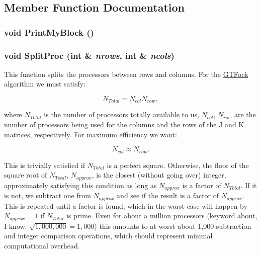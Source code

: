 \subsection{Member Function Documentation}
\hypertarget{classJKBuilder_1_1DistributedMatrix_a83da6054896e4107ab7e0c71fe0067ff}{
\subsubsection[{PrintMyBlock}]{\setlength{\rightskip}{0pt plus 5cm}void PrintMyBlock ()}}
\label{classJKBuilder_1_1DistributedMatrix_a83da6054896e4107ab7e0c71fe0067ff}
\hypertarget{classJKBuilder_1_1DistributedMatrix_a97f9cb6c12da83dc8006d442247a769a}{
\subsubsection[{SplitProc}]{\setlength{\rightskip}{0pt plus 5cm}void SplitProc (int \& {\em nrows}, \/  int \& {\em ncols})}}
\label{classJKBuilder_1_1DistributedMatrix_a97f9cb6c12da83dc8006d442247a769a}


This function splits the processors between rows and columns. For the \hyperlink{namespaceGTFock}{GTFock} algorithm we must satisfy:

\[ N_{Total}=N_{col}N_{row},\]

where $N_{Total}$ is the number of processors totally available to us, $N_{col}$, $N_{row}$ are the number of processors being used for the columns and the rows of the J and K matrices, respectively. For maximum efficiency we want:

\[N_{col}\approx N_{row}.\]

This is trivially satisfied if $N_{Total}$ is a perfect square. Otherwise, the floor of the square root of $N_{Total}$, $N_{approx}$, is the closest (without going over) integer, approximately satisfying this condition as long as $N_{approx}$ is a factor of $N_{Total}$. If it is not, we subtract one from $N_{approx}$ and see if the result is a factor of $N_{approx}$. This is repeated until a factor is found, which in the worst case will happen by $N_{approx}=1$ if $N_{Total}$ is prime. Even for about a million processors (keyword about, I know: $\sqrt{1,000,000}=1,000$) this amounts to at worst about 1,000 subtraction and integer comparison operations, which should represent minimal computational overhead.


